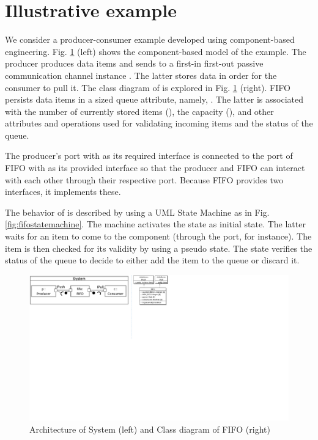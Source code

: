 \section{Illustrative example%
	}
\label{sec:motivation}

We consider a producer-consumer example developed using component-based engineering.
Fig. \ref{fig:cbseexample} (left) shows the component-based model of the example.
The  producer produces data items and sends to a first-in first-out passive communication channel instance .
The latter stores data in order for the consumer to pull it.
The class diagram of  is explored in Fig. \ref{fig:cbseexample} (right).
FIFO persists data items in a sized queue attribute, namely, .
The latter is associated with the number of currently stored items (), the capacity (), and other attributes and operations used for validating incoming items and the status of the queue.

The producer's port with  as its required interface is connected to the port of FIFO with  as its provided interface so that the producer and FIFO can interact with each other through their respective port.
Because FIFO provides two interfaces, it implements these.

The behavior of  is described by using a UML State Machine as in Fig. \ref{fig:fifostatemachine}.
The machine activates the  state as initial state.
The latter waits for an item to come to the  component (through the  port, for instance).
The item is then checked for its validity by using a  pseudo state.
The  state verifies the status of the queue to decide to either add the item to the queue or discard it.  


\begin{figure}
	\centering
	\includegraphics[clip, trim=0cm 14.9cm 14.9cm 0cm, width=\columnwidth]{figures/cbseexample.pdf}
	\caption{Architecture of System (left) and Class diagram of FIFO (right)} 
	\label{fig:cbseexample}
\end{figure}


